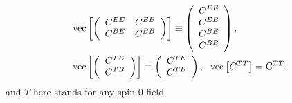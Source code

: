 \documentclass[usenatbib]{mnrasb}
\begin{document}
        \begin{align}
          &{\rm vec}\left[\left(\begin{array}{cc}
                          C^{EE} & C^{EB}\\
                          C^{BE} & C^{BB}
                         \end{array}\right)\right]\equiv
          \left(
          \begin{array}{c}
            C^{EE} \\
            C^{EB} \\
            C^{BE} \\
            C^{BB} \\
          \end{array}
          \right),\\
          &{\rm vec}\left[\left(\begin{array}{c}
                                 C^{TE}\\C^{TB}
                                \end{array}\right)\right]\equiv
            \left(\begin{array}{c}
                    C^{TE}\\C^{TB}
            \end{array}\right),
            \hspace{6pt}
            {\rm vec}\left[C^{TT}\right]={\rm C}^{TT},
        \end{align}
        and $T$ here stands for any spin-$0$ field.
      
\end{document}
